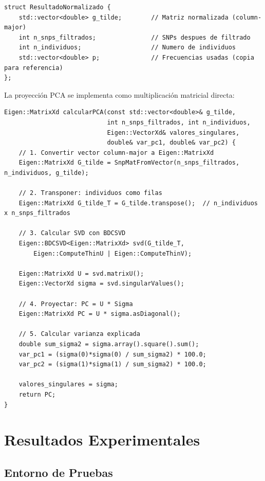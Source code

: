 \documentclass[12pt,a4paper]{article}
\theoremstyle{definition}
\begin{document}
\begin{lstlisting}[caption={Estructura ResultadoNormalizado (src/procesador\_pca.hpp).}]
struct ResultadoNormalizado {
    std::vector<double> g_tilde;        // Matriz normalizada (column-major)
    int n_snps_filtrados;               // SNPs despues de filtrado
    int n_individuos;                   // Numero de individuos
    std::vector<double> p;              // Frecuencias usadas (copia para referencia)
};
\end{lstlisting}

La proyecci\'{o}n PCA se implementa como multiplicaci\'{o}n matricial directa:

\begin{lstlisting}[caption={Proyeccion PCA: PC = U * Sigma (src/svd\_calculador.cpp).}]
Eigen::MatrixXd calcularPCA(const std::vector<double>& g_tilde,
                            int n_snps_filtrados, int n_individuos,
                            Eigen::VectorXd& valores_singulares,
                            double& var_pc1, double& var_pc2) {
    // 1. Convertir vector column-major a Eigen::MatrixXd
    Eigen::MatrixXd G_tilde = SnpMatFromVector(n_snps_filtrados, n_individuos, g_tilde);
    
    // 2. Transponer: individuos como filas
    Eigen::MatrixXd G_tilde_T = G_tilde.transpose();  // n_individuos x n_snps_filtrados
    
    // 3. Calcular SVD con BDCSVD
    Eigen::BDCSVD<Eigen::MatrixXd> svd(G_tilde_T, 
        Eigen::ComputeThinU | Eigen::ComputeThinV);
    
    Eigen::MatrixXd U = svd.matrixU();
    Eigen::VectorXd sigma = svd.singularValues();
    
    // 4. Proyectar: PC = U * Sigma
    Eigen::MatrixXd PC = U * sigma.asDiagonal();
    
    // 5. Calcular varianza explicada
    double sum_sigma2 = sigma.array().square().sum();
    var_pc1 = (sigma(0)*sigma(0) / sum_sigma2) * 100.0;
    var_pc2 = (sigma(1)*sigma(1) / sum_sigma2) * 100.0;
    
    valores_singulares = sigma;
    return PC;
}
\end{lstlisting}

\section{Resultados Experimentales}\label{sec:resultados}

\subsection{Entorno de Pruebas}
\end{document}
